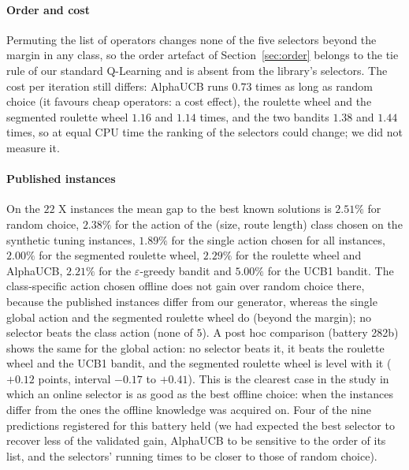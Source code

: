 \paragraph{Order and cost} Permuting the list of operators changes none of the five selectors beyond the margin in any class, so the order artefact of Section~\ref{sec:order} belongs to the tie rule of our standard Q-Learning and is absent from the library's selectors. The cost per iteration still differs: AlphaUCB runs $0.73$ times as long as random choice (it favours cheap operators: a cost effect), the roulette wheel and the segmented roulette wheel $1.16$ and $1.14$ times, and the two bandits $1.38$ and $1.44$ times, so at equal CPU time the ranking of the selectors could change; we did not measure it.

\paragraph{Published instances} On the $22$ X instances the mean gap to the best known solutions is $2.51\%$ for random choice, $2.38\%$ for the action of the (size, route length) class chosen on the synthetic tuning instances, $1.89\%$ for the single action chosen for all instances, $2.00\%$ for the segmented roulette wheel, $2.29\%$ for the roulette wheel and AlphaUCB, $2.21\%$ for the $\varepsilon$-greedy bandit and $5.00\%$ for the UCB1 bandit. The class-specific action chosen offline does not gain over random choice there, because the published instances differ from our generator, whereas the single global action and the segmented roulette wheel do (beyond the margin); no selector beats the class action (none of $5$). A post hoc comparison (battery 282b) shows the same for the global action: no selector beats it, it beats the roulette wheel and the UCB1 bandit, and the segmented roulette wheel is level with it ($+0.12$ points, interval $-0.17$ to $+0.41$). This is the clearest case in the study in which an online selector is as good as the best offline choice: when the instances differ from the ones the offline knowledge was acquired on. Four of the nine predictions registered for this battery held (we had expected the best selector to recover less of the validated gain, AlphaUCB to be sensitive to the order of its list, and the selectors' running times to be closer to those of random choice).


